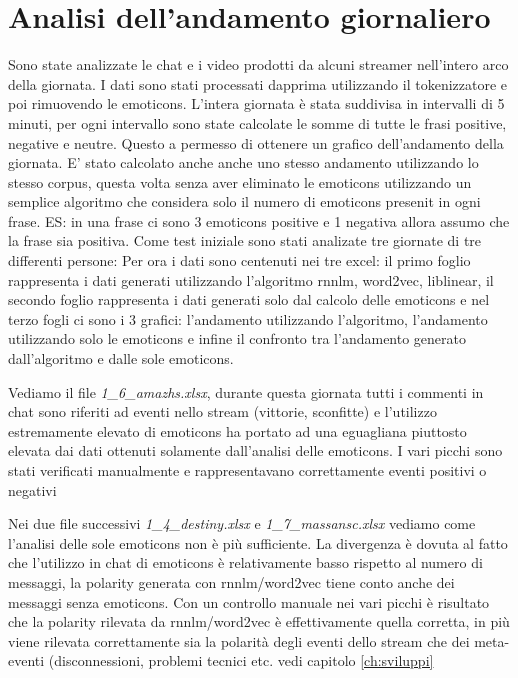 \documentclass[a4paper,12pt,openright,twoside]{report}
\theoremstyle{definition}
\begin{document}
\chapter{Analisi dell'andamento giornaliero}
Sono state analizzate le chat e i video prodotti da alcuni streamer nell'intero arco della giornata. I dati sono stati processati dapprima utilizzando il tokenizzatore e poi rimuovendo le emoticons. L'intera giornata è stata suddivisa in intervalli di 5 minuti, per ogni intervallo sono state calcolate le somme di tutte le frasi positive, negative e neutre. Questo a permesso di ottenere un grafico dell'andamento della giornata.
E' stato calcolato anche anche uno stesso andamento utilizzando lo stesso corpus, questa volta senza aver eliminato le emoticons utilizzando un semplice algoritmo che considera solo il numero di emoticons presenit in ogni frase. ES: in una frase ci sono 3 emoticons positive e 1 negativa allora assumo che la frase sia positiva.
Come test iniziale sono stati analizate tre giornate di tre differenti persone:
\newline
\newline
Per ora i dati sono centenuti nei tre excel: il primo foglio rappresenta i dati generati utilizzando l'algoritmo rnnlm, word2vec, liblinear, il secondo foglio rappresenta i dati generati solo dal calcolo delle emoticons e nel terzo fogli ci sono i 3 grafici: l'andamento utilizzando l'algoritmo, l'andamento utilizzando solo le emoticons e infine il confronto tra l'andamento generato dall'algoritmo e dalle sole emoticons.

Vediamo il file \emph{1\_6\_amazhs.xlsx}, durante questa giornata tutti i commenti in chat sono riferiti ad eventi nello stream (vittorie, sconfitte) e l'utilizzo estremamente elevato di emoticons ha portato ad una eguagliana piuttosto elevata dai dati ottenuti solamente dall'analisi delle emoticons. I vari picchi sono stati verificati manualmente e rappresentavano correttamente eventi positivi o negativi

Nei due file successivi \emph{1\_4\_destiny.xlsx} e \emph{1\_7\_massansc.xlsx} vediamo come l'analisi delle sole emoticons non è più sufficiente. La divergenza è dovuta al fatto che l'utilizzo in chat di emoticons è relativamente basso rispetto al numero di messaggi, la polarity generata con rnnlm/word2vec tiene conto anche dei messaggi senza emoticons. Con un controllo manuale nei vari picchi è risultato che la polarity rilevata da rnnlm/word2vec è effettivamente quella corretta, in più viene rilevata correttamente sia la polarità degli eventi dello stream che dei meta-eventi (disconnessioni, problemi tecnici etc. vedi capitolo \ref{ch:sviluppi}
\end{document}
